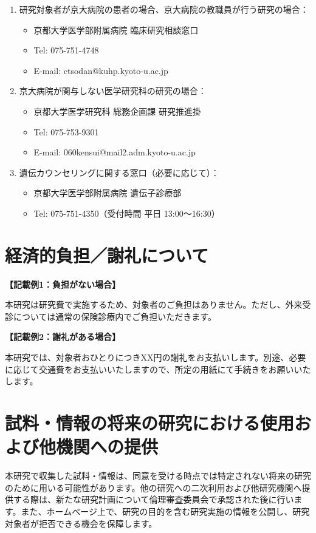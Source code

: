 \documentclass[a4paper,11pt,lualatex,ja=standard]{bxjsarticle}
\begin{document}
\begin{enumerate}
\item 研究対象者が京大病院の患者の場合、京大病院の教職員が行う研究の場合：
  \begin{itemize}
  \item 京都大学医学部附属病院 臨床研究相談窓口
  \item Tel: 075-751-4748
  \item E-mail: ctsodan@kuhp.kyoto-u.ac.jp
  \end{itemize}

\item 京大病院が関与しない医学研究科の研究の場合：
  \begin{itemize}
  \item 京都大学医学研究科 総務企画課 研究推進掛
  \item Tel: 075-753-9301
  \item E-mail: 060kensui@mail2.adm.kyoto-u.ac.jp
  \end{itemize}

\item 遺伝カウンセリングに関する窓口（必要に応じて）：
  \begin{itemize}
  \item 京都大学医学部附属病院 遺伝子診療部
  \item Tel: 075-751-4350（受付時間 平日 13:00〜16:30）
  \end{itemize}
\end{enumerate}

\section{経済的負担／謝礼について}

\textbf{【記載例1：負担がない場合】}

本研究は研究費で実施するため、対象者のご負担はありません。ただし、外来受診については通常の保険診療内でご負担いただきます。

\textbf{【記載例2：謝礼がある場合】}

本研究では、対象者おひとりにつきXX円の謝礼をお支払いします。別途、必要に応じて交通費をお支払いいたしますので、所定の用紙にて手続きをお願いいたします。

\section{試料・情報の将来の研究における使用および他機関への提供}

本研究で収集した試料・情報は、同意を受ける時点では特定されない将来の研究のために用いる可能性があります。他の研究への二次利用および他研究機関へ提供する際は、新たな研究計画について倫理審査委員会で承認された後に行います。また、ホームページ上で、研究の目的を含む研究実施の情報を公開し、研究対象者が拒否できる機会を保障します。
\end{document}
